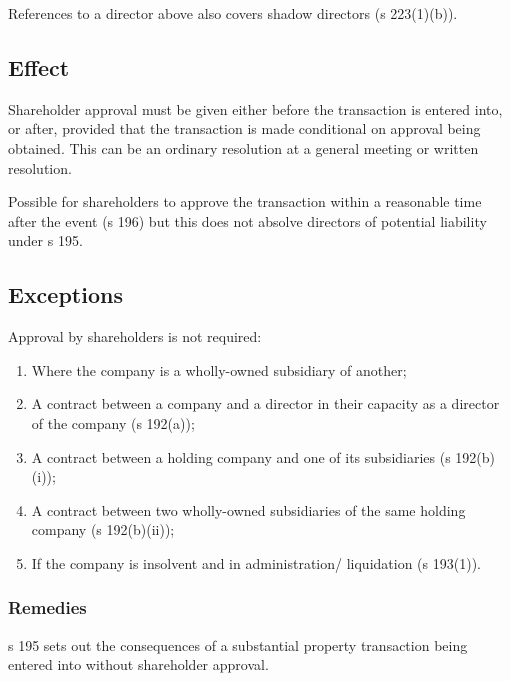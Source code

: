 \documentclass[
]{article}
\providecommand{\tightlist}{%
  \setlength{\itemsep}{0pt}\setlength{\parskip}{0pt}}
\begin{document}
References to a director above also covers shadow directors (s
223(1)(b)).

\hypertarget{effect}{%
\subsection{Effect}\label{effect}}

Shareholder approval must be given either before the transaction is
entered into, or after, provided that the transaction is made
conditional on approval being obtained. This can be an ordinary
resolution at a general meeting or written resolution.

Possible for shareholders to approve the transaction within a reasonable
time after the event (s 196) but this does not absolve directors of
potential liability under s 195.

\hypertarget{exceptions-1}{%
\subsection{Exceptions}\label{exceptions-1}}

Approval by shareholders is not required:

\begin{enumerate}
\tightlist
\item
  Where the company is a wholly-owned subsidiary of another;
\item
  A contract between a company and a director in their capacity as a
  director of the company (s 192(a));
\item
  A contract between a holding company and one of its subsidiaries (s
  192(b)(i));
\item
  A contract between two wholly-owned subsidiaries of the same holding
  company (s 192(b)(ii));
\item
  If the company is insolvent and in administration/ liquidation (s
  193(1)).
\end{enumerate}

\hypertarget{remedies-1}{%
\subsubsection{Remedies}\label{remedies-1}}

s 195 sets out the consequences of a substantial property transaction
being entered into without shareholder approval.
\end{document}
